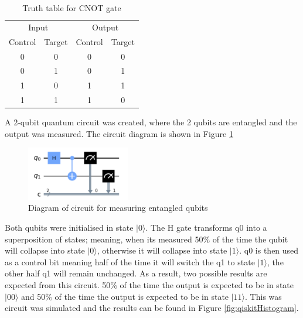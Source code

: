 \begin{table}[h]
\centering
\begin{tabular}{cccc}
\multicolumn{2}{c}{Input}                         & \multicolumn{2}{c}{Output}   \\ 
\multicolumn{1}{c|}{Control} & \multicolumn{1}{c||}{Target} & \multicolumn{1}{c|}{Control} & Target \\ \hline\hline
\multicolumn{1}{c|}{0}  & \multicolumn{1}{c||}{0}  & \multicolumn{1}{c|}{0}  & 0  \\ \hline
\multicolumn{1}{c|}{0}  & \multicolumn{1}{c||}{1}  & \multicolumn{1}{c|}{0}  & 1  \\ \hline
\multicolumn{1}{c|}{1}  & \multicolumn{1}{c||}{0}  & \multicolumn{1}{c|}{1}  & 1  \\ \hline
\multicolumn{1}{c|}{1}  & \multicolumn{1}{c||}{1}  & \multicolumn{1}{c|}{1}  & 0 
\end{tabular}
\label{tab:cNotTruth}
\caption{Truth table for CNOT gate}
\end{table}




A 2-qubit quantum circuit was created, where the 2 qubits are entangled and the output was measured. The circuit diagram is shown in Figure \ref{fig:entangleMeasure}

\begin{figure}[h]
    \centering
    \includegraphics[width=0.4\textwidth]{lab2/images/entangleMeasure.png}
    \caption{Diagram of circuit for measuring entangled qubits} 
    \label{fig:entangleMeasure}
\end{figure}

Both qubits were initialised in state $|0\rangle$. The H gate transforms q0 into a superposition of states; meaning, when its measured 50\% of the time the qubit will collapse into state $|0\rangle$, otherwise it will collapse into state $|1\rangle$. q0 is then used as a control bit meaning half of the time it will switch the q1 to state $|1\rangle$, the other half q1 will remain unchanged. As a result, two possible results are expected from this circuit. 50\% of the time the output is expected to be in state $|00\rangle$ and 50\% of the time the output is expected to be in state $|11\rangle$. This was circuit was simulated and the results can be found in Figure \ref{fig:qiskitHistogram}.

